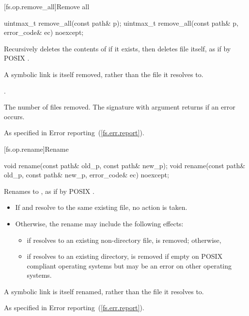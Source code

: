 [fs.op.remove_all]{Remove all}

%
\begin{itemdecl}
uintmax_t remove_all(const path& p);
uintmax_t remove_all(const path& p, error_code& ec) noexcept;
\end{itemdecl}

\begin{itemdescr}
\pnum
\effects Recursively deletes the contents of  if it exists,
  then deletes file  itself, as if by POSIX .
\begin{note} A symbolic link is itself removed, rather than the file it
  resolves to. \end{note}

\pnum
\postconditions {}.

\pnum
\returns The number of files removed. The signature with argument
   returns  if an error
  occurs.

\pnum
\throws As specified in Error reporting~(\ref{fs.err.report}).
\end{itemdescr}


[fs.op.rename]{Rename}

%
\begin{itemdecl}
void rename(const path& old_p, const path& new_p);
void rename(const path& old_p, const path& new_p, error_code& ec) noexcept;
\end{itemdecl}

\begin{itemdescr}
\pnum
\effects Renames  to , as if by
  POSIX .

\begin{note}
\begin{itemize}
\item If  and  resolve to the same existing file,
   no action is taken.
\item Otherwise, the rename may include the following effects:
\begin{itemize}
\item if  resolves to an existing non-directory file,
     is removed; otherwise,
\item if  resolves to an existing directory,
     is removed if empty on POSIX compliant operating systems
    but may be an error on other operating systems.
\end{itemize}
\end{itemize}
A symbolic link is itself renamed, rather than the file it resolves to.
\end{note}

\pnum
\throws As specified in Error reporting~(\ref{fs.err.report}).
\end{itemdescr}


